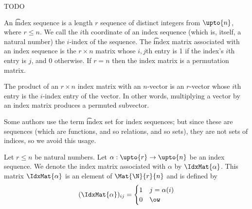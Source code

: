 
\sbasic

































\sstart
{}


TODO


An \t{index sequence} is a length $r$ sequence of distinct integers from $\upto{n}$, where $r \leq n$.
We call the $i$th coordinate of an index sequence (which is, itself, a natural number) the \t{$i$-index} of the sequence.
The \t{index matrix} associated with an index sequence is the $r \times n$ matrix whose $i,j$th entry is 1 if the index's $i$th entry is $j$, and $0$ otherwise.
If $r = n$ then the index matrix is a permutation matrix.

The product of an $r \times n$ index matrix with an $n$-vector is an $r$-vector whose $i$th entry is the $i$-index entry of the vector.
In other words, multiplying a vector by an index matrix produces a permuted subvector.

Some authors use the term \t{index set} for index sequences; but since these are sequences (which are functions, and so relations, and so sets), they are not sets of indices, so we avoid this usage.


Let $r \leq n$ be natural numbers.
Let $\alpha: \upto{r} \to \upto{n}$ be an index sequence.
We denote the index matrix associated with $\alpha$ by $\IdxMat{\alpha}$.
This matrix $\IdxMat{\alpha}$ is an element of $\Mat{\N}{r}{n}$ and is defined by
$$
    (\IdxMat{\alpha})_{ij} = \begin{cases}
    1 & j = \alpha(i) \\
    0 & \ow
  \end{cases}
$$

